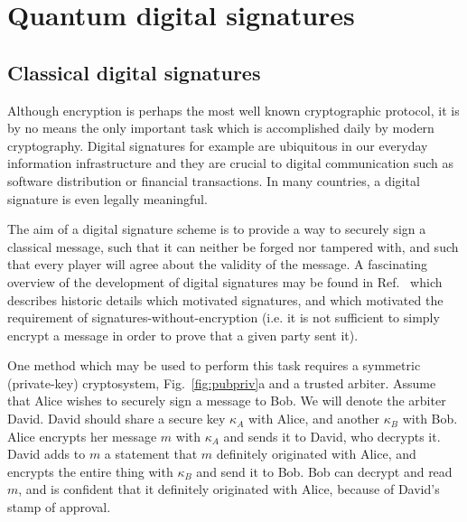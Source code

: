 \section{Quantum digital signatures}\label{sec:lit_review_qds}


\subsection{Classical digital signatures}

Although encryption is perhaps the most well known cryptographic protocol, it is by no means the only important task which is accomplished daily by modern cryptography. Digital signatures for example are ubiquitous in our everyday information infrastructure and they are crucial to digital communication such as software distribution or financial transactions. In many countries, a digital signature is even legally meaningful.

The aim of a digital signature scheme is to provide a way to securely sign a classical message, such that it can neither be forged nor tampered with, and such that every player will agree about the validity of the message. A fascinating overview of the development of digital signatures may be found in Ref.~\cite{Simmons1988} which describes historic details which motivated signatures, and which motivated the requirement of signatures-without-encryption (i.e. it is not sufficient to simply encrypt a message in order to prove that a given party sent it).

One method which may be used to perform this task requires a symmetric (private-key) cryptosystem, Fig.~\ref{fig:pubpriv}a and a trusted arbiter. Assume that Alice wishes to securely sign a message to Bob. We will denote the arbiter David. David should share a secure key $\kappa_A$ with Alice, and another $\kappa_B$ with Bob. Alice encrypts her message $m$ with $\kappa_A$ and sends it to David, who decrypts it. David adds to $m$ a statement that $m$ definitely originated with Alice, and encrypts the entire thing with $\kappa_B$ and send it to Bob. Bob can decrypt and read $m$, and is confident that it definitely originated with Alice, because of David's stamp of approval.

